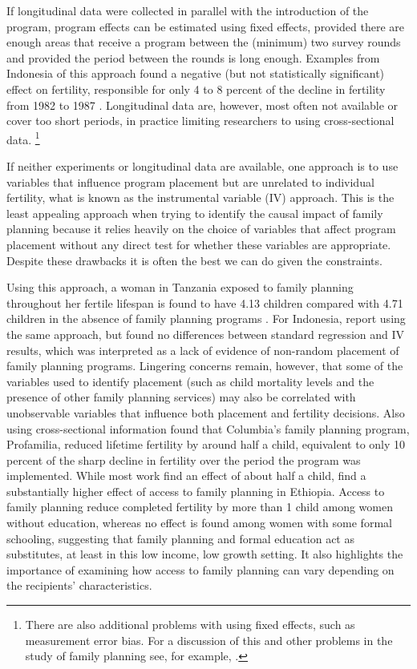 \documentclass[letterpaper,12pt]{article}
\begin{document}
If longitudinal data were collected in parallel with the introduction of the 
program, program effects can be estimated using fixed effects, provided there
are enough areas that receive a program between the (minimum) 
two survey rounds and provided the period between the rounds is long 
enough.
Examples from Indonesia of this approach found a negative (but not statistically 
significant) effect on fertility, responsible for only 4 to 8 percent of the 
decline in fertility from 1982 to 1987 \citep{pitt93,Gertler1994}.
Longitudinal data are, however, most often not available or cover too short 
periods, in practice limiting researchers to using cross-sectional data.%
\footnote{%
There are also additional problems with using fixed effects, such as measurement error 
bias.
For a discussion of this and other problems in the study of family planning
see, for example, \cite{angeles98}.
}

If neither experiments or longitudinal data are available, one approach is to use 
variables that influence program placement but are unrelated to individual fertility,
what is known as the instrumental variable (IV) approach.
This is the least appealing approach when trying to identify the causal
impact of family planning because it relies heavily on the choice of
variables that affect program placement without any direct test for whether
these variables are appropriate.
Despite these drawbacks it is often the best we can do given the constraints.

Using this approach, a woman in Tanzania exposed to family planning throughout 
her fertile lifespan is found to have 4.13 children compared with 4.71 children 
in the absence of family planning programs \citep{angeles98}.
For Indonesia, \cite{Angeles2005} report using the same approach, but found
no differences between standard regression and IV results, which was interpreted
as a lack of evidence of non-random placement of family planning programs.
Lingering concerns remain, however, that some of the variables used to identify placement
(such as child mortality levels and the presence of other family planning services)
may also be correlated with unobservable variables that influence 
both placement and fertility decisions.
Also using cross-sectional information \cite{Miller2010} found that Columbia's family 
planning program, Profamilia, reduced lifetime fertility by around 
half a child, equivalent to only 10 percent of the sharp decline in fertility 
over the period the program was implemented.
While most work find an effect of about half a child, \citet{Portner2011}
find a substantially higher effect of access to family planning in Ethiopia.
Access to family planning reduce completed fertility by more than 1 child among 
women without education, whereas no effect is found among women with some formal 
schooling, suggesting that family planning and formal education act as 
substitutes, at least in this low income, low growth setting. 
It also highlights the importance of examining how access to family planning
can vary depending on the recipients' characteristics.
\end{document}
